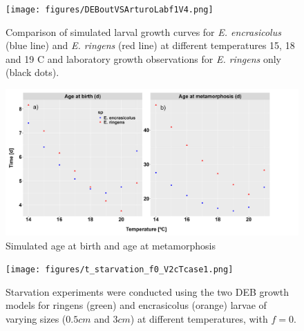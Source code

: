 \begin{figure}[ht]
	\texttt{[image: figures/DEBoutVSArturoLabf1V4.png]}
	\centering
	\caption{Comparison of simulated larval growth curves for \textit{E. encrasicolus} (blue line) and \textit{E. ringens} (red line) at different temperatures 15, 18 and 19 \textdegree C and laboratory growth observations for \textit{E. ringens} only (black dots).}
	\label{DEBoutVSArturoLabf1V4}
\end{figure}

\begin{figure}[ht]
	\includegraphics[width=1.0\textwidth]{figures/age_transitions2SPcTcase1.png}
	\centering
	\caption{Simulated age at birth and age at metamorphosis}
	\label{TallasVSdata}
\end{figure}

\begin{figure}[ht]
	\texttt{[image: figures/t\_starvation\_f0\_V2cTcase1.png]}
	\centering
	\caption{Starvation experiments were conducted using the two DEB growth models for \gls{ringens} (green) and \gls{encrasicolus} (orange) larvae of varying sizes ($0.5 cm$ and $3 cm$) at different temperatures, with $f = 0$.}
	\label{t_starvation_f0_V2}
\end{figure}





%


